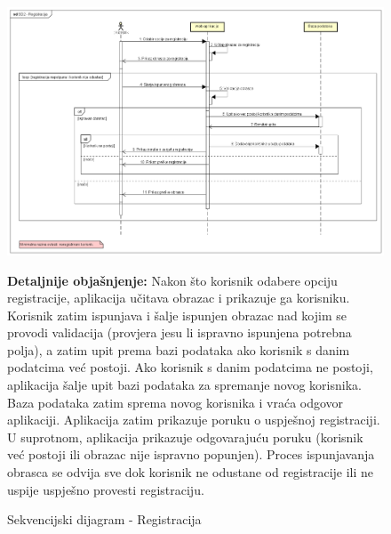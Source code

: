 				\begin{figure}[hp!]
					\centering
					\includegraphics[width=\textwidth]{slike/SD2 - Registracija.png}
					\caption{Sekvencijski dijagram - Registracija}
					\begin{flushleft}
						\textbf{Detaljnije objašnjenje:}
						Nakon što korisnik odabere opciju registracije, aplikacija učitava obrazac i prikazuje ga korisniku. Korisnik zatim ispunjava i šalje ispunjen obrazac nad kojim se provodi validacija (provjera jesu li ispravno ispunjena potrebna polja), a zatim upit prema bazi podataka ako korisnik s danim podatcima već postoji. Ako korisnik s danim podatcima ne postoji, aplikacija šalje upit bazi podataka za spremanje novog korisnika. Baza podataka zatim sprema novog korisnika i vraća odgovor aplikaciji. Aplikacija zatim prikazuje poruku o uspješnoj registraciji. U suprotnom, aplikacija prikazuje odgovarajuću poruku (korisnik već postoji ili obrazac nije ispravno popunjen). Proces ispunjavanja obrasca se odvija sve dok korisnik ne odustane od registracije ili ne uspije uspješno provesti registraciju.
					\end{flushleft}
				\end{figure}
				\pagebreak
